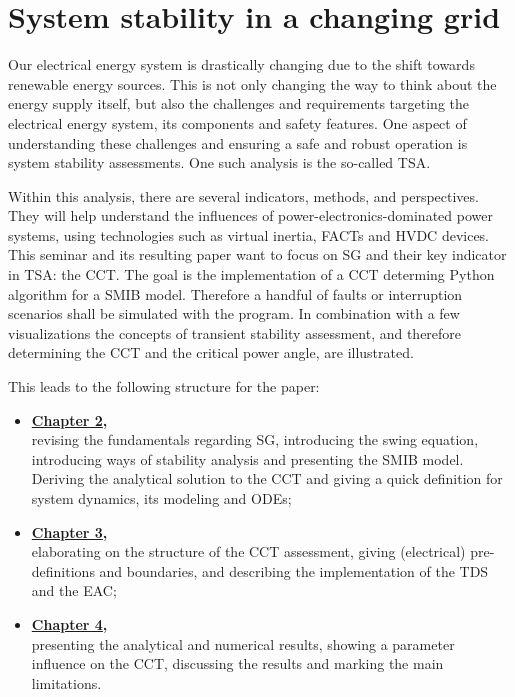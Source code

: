 
\chapter{System stability in a changing grid}
\label{chap:intro}

Our electrical energy system is drastically changing due to the shift towards renewable energy sources. This is not only changing the way to think about the energy supply itself, but also the challenges and requirements targeting the electrical energy system, its components and safety features. One aspect of understanding these challenges and ensuring a safe and robust operation is system stability assessments. One such analysis is the so-called \acf{TSA}. \autocite{vdeverbandderelektrotechnikelektronikinformationstechnike.v.PerspektivenElektrischenEnergieubertragung2019}

Within this analysis, there are several indicators, methods, and perspectives. They will help understand the influences of power-electronics-dominated power systems, using technologies such as virtual inertia, FACTs and HVDC devices. This seminar and its resulting paper want to focus on \acf{SG} and their key indicator in \acs{TSA}: the \acf{CCT}. \autocite{gloverPowerSystemAnalysis2017,kundurPowerSystemStability2022,machowskiPowerSystemDynamics2020,oedingElektrischeKraftwerkeUnd2016,schwabElektroenergiesystemeSmarteStromversorgung2022} The goal is the implementation of a \ac{CCT} determing Python algorithm for a \ac{SMIB} model. Therefore a handful of faults or interruption scenarios shall be simulated with the program. In combination with a few visualizations the concepts of transient stability assessment, and therefore determining the \ac{CCT} and the critical power angle, are illustrated.

This leads to the following structure for the paper: 
\begin{itemize}
    \item \textbf{\hyperref[chap:fundamentals]{Chapter 2},}\\
    revising the fundamentals regarding \acs{SG}, introducing the swing equation, introducing ways of stability analysis and presenting the \acs{SMIB} model. Deriving the analytical solution to the \acs{CCT} and giving a quick definition for system dynamics, its modeling and \acsp{ODE};
    \item \textbf{\hyperref[chap:methods]{Chapter 3},}\\
    elaborating on the structure of the \acs{CCT} assessment, giving (electrical) pre-definitions and boundaries, and describing the implementation of the \acs{TDS} and the \acs{EAC};
    \item \textbf{\hyperref[chap:results]{Chapter 4},}\\
    presenting the analytical and numerical results, showing a parameter influence on the \acs{CCT}, discussing the results and marking the main limitations.
\end{itemize}

%     
